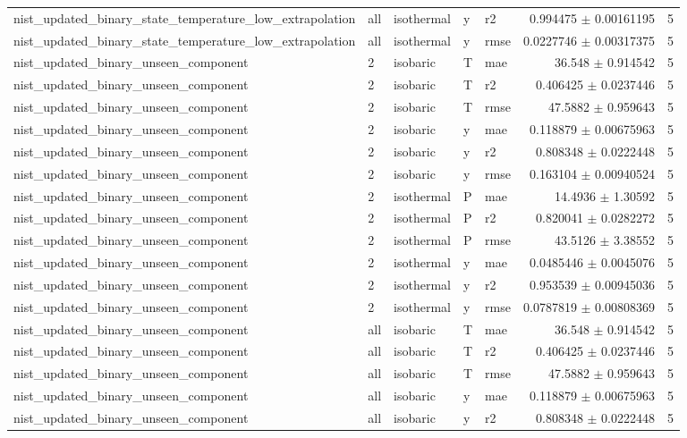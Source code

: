 \begin{tabular}{lllllrr}
nist\_updated\_binary\_state\_temperature\_low\_extrapolation & all & isothermal & y & r2 & 0.994475 $\pm$ 0.00161195 & 5 \\
nist\_updated\_binary\_state\_temperature\_low\_extrapolation & all & isothermal & y & rmse & 0.0227746 $\pm$ 0.00317375 & 5 \\
nist\_updated\_binary\_unseen\_component & 2 & isobaric & T & mae & 36.548 $\pm$ 0.914542 & 5 \\
nist\_updated\_binary\_unseen\_component & 2 & isobaric & T & r2 & 0.406425 $\pm$ 0.0237446 & 5 \\
nist\_updated\_binary\_unseen\_component & 2 & isobaric & T & rmse & 47.5882 $\pm$ 0.959643 & 5 \\
nist\_updated\_binary\_unseen\_component & 2 & isobaric & y & mae & 0.118879 $\pm$ 0.00675963 & 5 \\
nist\_updated\_binary\_unseen\_component & 2 & isobaric & y & r2 & 0.808348 $\pm$ 0.0222448 & 5 \\
nist\_updated\_binary\_unseen\_component & 2 & isobaric & y & rmse & 0.163104 $\pm$ 0.00940524 & 5 \\
nist\_updated\_binary\_unseen\_component & 2 & isothermal & P & mae & 14.4936 $\pm$ 1.30592 & 5 \\
nist\_updated\_binary\_unseen\_component & 2 & isothermal & P & r2 & 0.820041 $\pm$ 0.0282272 & 5 \\
nist\_updated\_binary\_unseen\_component & 2 & isothermal & P & rmse & 43.5126 $\pm$ 3.38552 & 5 \\
nist\_updated\_binary\_unseen\_component & 2 & isothermal & y & mae & 0.0485446 $\pm$ 0.0045076 & 5 \\
nist\_updated\_binary\_unseen\_component & 2 & isothermal & y & r2 & 0.953539 $\pm$ 0.00945036 & 5 \\
nist\_updated\_binary\_unseen\_component & 2 & isothermal & y & rmse & 0.0787819 $\pm$ 0.00808369 & 5 \\
nist\_updated\_binary\_unseen\_component & all & isobaric & T & mae & 36.548 $\pm$ 0.914542 & 5 \\
nist\_updated\_binary\_unseen\_component & all & isobaric & T & r2 & 0.406425 $\pm$ 0.0237446 & 5 \\
nist\_updated\_binary\_unseen\_component & all & isobaric & T & rmse & 47.5882 $\pm$ 0.959643 & 5 \\
nist\_updated\_binary\_unseen\_component & all & isobaric & y & mae & 0.118879 $\pm$ 0.00675963 & 5 \\
nist\_updated\_binary\_unseen\_component & all & isobaric & y & r2 & 0.808348 $\pm$ 0.0222448 & 5 \\

\end{tabular}
